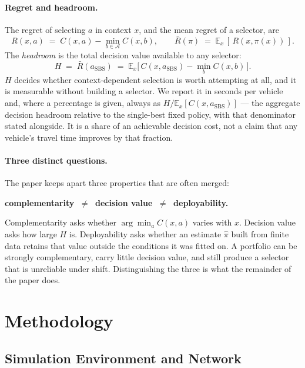 \paragraph{Regret and headroom.}
The regret of selecting $a$ in context $x$, and the mean regret of a selector,
are
\begin{equation}
R(x,a) \;=\; C(x,a) - \min_{b \in \mathcal{A}} C(x,b),
\qquad
\bar{R}(\pi) \;=\; \mathbb{E}_x\,[\,R(x,\pi(x))\,].
\end{equation}
The \emph{headroom} is the total decision value available to any selector:
\begin{equation}
H \;=\; \bar{R}(a_{\mathrm{SBS}})
   \;=\; \mathbb{E}_x\big[\,C(x,a_{\mathrm{SBS}}) - \min_b C(x,b)\,\big].
\label{eq:headroom}
\end{equation}
$H$ decides whether context-dependent selection is worth attempting at all, and
it is measurable without building a selector. We report it in seconds per
vehicle and, where a percentage is given, always as
$H / \mathbb{E}_x[C(x,a_{\mathrm{SBS}})]$ --- the aggregate decision headroom
relative to the single-best fixed policy, with that denominator stated
alongside. It is a share of an achievable decision cost, not a claim that any
vehicle's travel time improves by that fraction.

\paragraph{Three distinct questions.}
The paper keeps apart three properties that are often merged:
\begin{center}
\textbf{complementarity} $\;\neq\;$ \textbf{decision value} $\;\neq\;$
\textbf{deployability.}
\end{center}
Complementarity asks whether $\arg\min_a C(x,a)$ varies with $x$. Decision value
asks how large $H$ is. Deployability asks whether an estimate $\hat{\pi}$ built
from finite data retains that value outside the conditions it was fitted on. A
portfolio can be strongly complementary, carry little decision value, and still
produce a selector that is unreliable under shift. Distinguishing the three is
what the remainder of the paper does.

\section{Methodology}

\subsection{Simulation Environment and Network}

